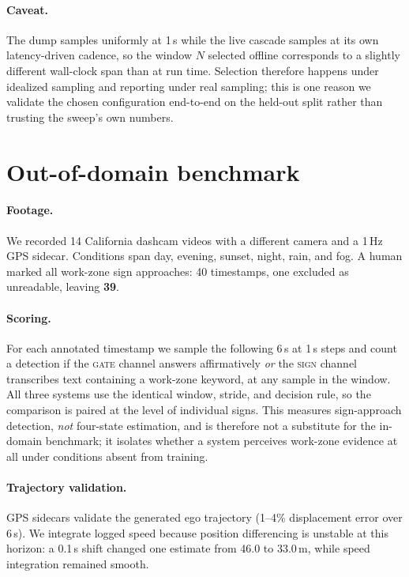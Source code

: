 \documentclass[10pt,twocolumn,letterpaper]{article}
\begin{document}
\paragraph{Caveat.}  The dump samples uniformly at 1\,s while the live cascade samples at its own latency-driven cadence, so the window $N$ selected offline corresponds to a slightly different wall-clock span than at run time.  Selection therefore happens under idealized sampling and reporting under real sampling; this is one reason we validate the chosen configuration end-to-end on the held-out split rather than trusting the sweep's own numbers.

\section{Out-of-domain benchmark}
\label{supp:ood}

\paragraph{Footage.}  We recorded 14 California dashcam videos with a different camera and a 1\,Hz GPS sidecar.  Conditions span day, evening, sunset, night, rain, and fog.  A human marked all work-zone sign approaches: 40 timestamps, one excluded as unreadable, leaving \textbf{39}.

\paragraph{Scoring.}  For each annotated timestamp we sample the following 6\,s at 1\,s steps and count a detection if the \textsc{gate} channel answers affirmatively \emph{or} the \textsc{sign} channel transcribes text containing a work-zone keyword, at any sample in the window.  All three systems use the identical window, stride, and decision rule, so the comparison is paired at the level of individual signs.  This measures sign-approach detection, \emph{not} four-state estimation, and is therefore not a substitute for the in-domain benchmark; it isolates whether a system perceives work-zone evidence at all under conditions absent from training.

\paragraph{Trajectory validation.}  GPS sidecars validate the generated ego trajectory (1--4\% displacement error over 6\,s).  We integrate logged speed because position differencing is unstable at this horizon: a 0.1\,s shift changed one estimate from 46.0 to 33.0\,m, while speed integration remained smooth.
\end{document}
